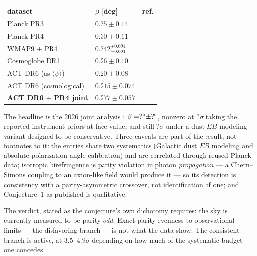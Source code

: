 \documentclass[11pt,a4paper]{article}
\newcommand{\CFBetaMeasured}{?}\newcommand{\CFBetaPred}{?}
\newcommand{\CFBetaZDust}{?}\newcommand{\CFBetaZFace}{?}
\theoremstyle{plain}
\theoremstyle{definition}
\begin{document}
\begin{center}
\begin{tabular}{lll}
\toprule
dataset & $\beta$ [deg] & ref.\\
\midrule
Planck PR3 & $0.35\pm0.14$ & \cite{MinamiKomatsu2020}\\
Planck PR4 & $0.30\pm0.11$ & \cite{DiegoPalazuelos2022}\\
WMAP9 $+$ PR4 & $0.342^{+0.094}_{-0.091}$ & \cite{EskiltKomatsu2022}\\
Cosmoglobe DR1 & $0.26\pm0.10$ & \cite{Cosmoglobe2023}\\
ACT DR6 (as $\langle\psi\rangle$) & $0.20\pm0.08$ & \cite{ACTDR6}\\
ACT DR6 (cosmological) & $0.215\pm0.074$ & \cite{DPK2025}\\
\textbf{ACT DR6 $+$ PR4 joint} & $\mathbf{0.277\pm0.057}$ &
\cite{Eskilt2026}\\
\bottomrule
\end{tabular}
\end{center}

The headline is the 2026 joint analysis \cite{Eskilt2026}:
$\beta=\CFBetaMeasured^{\circ}\pm\CFBetaSigma^{\circ}$, nonzero at
$\CFBetaZFace\sigma$ taking the reported instrument priors at face
value, and still $\CFBetaZDust\sigma$ under a dust-$EB$ modeling
variant designed to be conservative. Three caveats are part of the
result, not footnotes to it: the entries share two systematics
(Galactic dust $EB$ modeling and absolute polarization-angle
calibration) and are correlated through reused Planck data; isotropic
birefringence is parity violation in photon \emph{propagation} --- a
Chern--Simons coupling to an axion-like field would produce it ---
so its detection is consistency with a parity-asymmetric crossover,
not identification of one; and Conjecture~1 as published is
qualitative.

The verdict, stated as the conjecture's own dichotomy requires: the
sky is currently measured to be parity-\emph{odd}. Exact
parity-evenness to observational limits --- the disfavoring branch ---
is not what the data show. The consistent branch is active, at
$3.5$--$4.9\sigma$ depending on how much of the systematic budget one
concedes.
\end{document}
